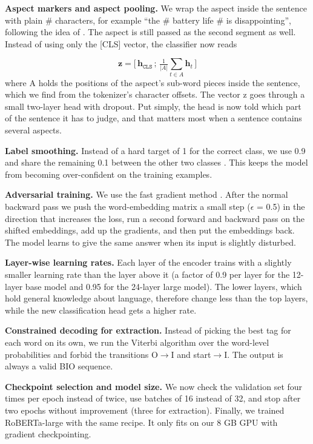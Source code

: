 \documentclass[11pt]{article}
\begin{document}
\textbf{Aspect markers and aspect pooling.} We wrap the aspect inside the sentence with plain \# characters, for example ``the \# battery life \# is disappointing'', following the idea of \citet{zhou2022improved}. The aspect is still passed as the second segment as well. Instead of using only the [CLS] vector, the classifier now reads

\begin{equation}
\mathbf{z} = \big[\,\mathbf{h}_{\texttt{CLS}} \,;\, \tfrac{1}{|A|}\textstyle\sum_{t \in A} \mathbf{h}_t\,\big]
\end{equation}
where A holds the positions of the aspect's sub-word pieces inside the sentence, which we find from the tokenizer's character offsets. The vector z goes through a small two-layer head with dropout. Put simply, the head is now told which part of the sentence it has to judge, and that matters most when a sentence contains several aspects.

\textbf{Label smoothing.} Instead of a hard target of 1 for the correct class, we use 0.9 and share the remaining 0.1 between the other two classes \citep{szegedy2016rethinking}. This keeps the model from becoming over-confident on the training examples.

\textbf{Adversarial training.} We use the fast gradient method \citep{miyato2017adversarial}. After the normal backward pass we push the word-embedding matrix a small step ($\epsilon$ = 0.5) in the direction that increases the loss, run a second forward and backward pass on the shifted embeddings, add up the gradients, and then put the embeddings back. The model learns to give the same answer when its input is slightly disturbed.

\textbf{Layer-wise learning rates.} Each layer of the encoder trains with a slightly smaller learning rate than the layer above it (a factor of 0.9 per layer for the 12-layer base model and 0.95 for the 24-layer large model). The lower layers, which hold general knowledge about language, therefore change less than the top layers, while the new classification head gets a higher rate.

\textbf{Constrained decoding for extraction.} Instead of picking the best tag for each word on its own, we run the Viterbi algorithm over the word-level probabilities and forbid the transitions O$\to$I and start$\to$I. The output is always a valid BIO sequence.

\textbf{Checkpoint selection and model size.} We now check the validation set four times per epoch instead of twice, use batches of 16 instead of 32, and stop after two epochs without improvement (three for extraction). Finally, we trained RoBERTa-large with the same recipe. It only fits on our 8 GB GPU with gradient checkpointing.
\end{document}
